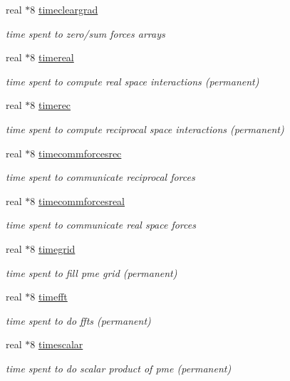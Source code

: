 \begin{DoxyCompactItemize}
real $\ast$8 \hyperlink{classtimestat_aee23bffbb72e8e484b94e38148eb4a99}{timecleargrad}
\begin{DoxyCompactList}\small\item\em time spent to zero/sum forces arrays \end{DoxyCompactList}\item 
real $\ast$8 \hyperlink{classtimestat_a14c3974861622792ed151280bf66ddd7}{timereal}
\begin{DoxyCompactList}\small\item\em time spent to compute real space interactions (permanent) \end{DoxyCompactList}\item 
real $\ast$8 \hyperlink{classtimestat_a11214b085ac634ed9c666d849eae5270}{timerec}
\begin{DoxyCompactList}\small\item\em time spent to compute reciprocal space interactions (permanent) \end{DoxyCompactList}\item 
real $\ast$8 \hyperlink{classtimestat_a07c1ac80b0d1f0ca25e058e1cf36b33e}{timecommforcesrec}
\begin{DoxyCompactList}\small\item\em time spent to communicate reciprocal forces \end{DoxyCompactList}\item 
real $\ast$8 \hyperlink{classtimestat_a8d3910d1238b8bb3013c0e392c4ecea0}{timecommforcesreal}
\begin{DoxyCompactList}\small\item\em time spent to communicate real space forces \end{DoxyCompactList}\item 
real $\ast$8 \hyperlink{classtimestat_af5098b97a125bfdf3477ad304323ab46}{timegrid}
\begin{DoxyCompactList}\small\item\em time spent to fill pme grid (permanent) \end{DoxyCompactList}\item 
real $\ast$8 \hyperlink{classtimestat_aeea025c909fbadaa04547e05c618e89e}{timefft}
\begin{DoxyCompactList}\small\item\em time spent to do ffts (permanent) \end{DoxyCompactList}\item 
real $\ast$8 \hyperlink{classtimestat_a2223e0c223cbc29e77375d92ccf3e760}{timescalar}
\begin{DoxyCompactList}\small\item\em time spent to do scalar product of pme (permanent) \end{DoxyCompactList}\item 

\end{DoxyCompactItemize}
